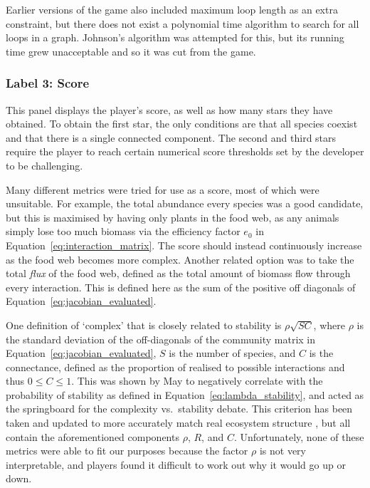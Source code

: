 Earlier versions of the game also included maximum loop length as an extra constraint, but there does not exist a polynomial time algorithm to search for all loops in a graph. Johnson's algorithm was attempted for this, but its running time grew unacceptable and so it was cut from the game.

\subsubsection{Label 3: Score}
This panel displays the player's score, as well as how many stars they have obtained. To obtain the first star, the only conditions are that all species coexist and that there is a single connected component. The second and third stars require the player to reach certain numerical score thresholds set by the developer to be challenging.

Many different metrics were tried for use as a score, most of which were unsuitable. For example, the total abundance every species was a good candidate, but this is maximised by having only plants in the food web, as any animals simply lose too much biomass via the efficiency factor $e_0$ in Equation~\eqref{eq:interaction_matrix}. The score should instead continuously increase as the food web becomes more complex. Another related option was to take the total \emph{flux} of the food web, defined as the total amount of biomass flow through every interaction. This is defined here as the sum of the positive off diagonals of Equation~\eqref{eq:jacobian_evaluated}.

One definition of `complex' that is closely related to stability is $\rho\sqrt{SC}$, where $\rho$ is the standard deviation of the off-diagonals of the community matrix in Equation~\ref{eq:jacobian_evaluated}, $S$ is the number of species, and $C$ is the connectance, defined as the proportion of realised to possible interactions and thus $0\leq C\leq1$. This was shown by May to negatively correlate with the probability of stability as defined in Equation~\eqref{eq:lambda_stability}, and acted as the springboard for the complexity vs.\ stability debate.
This criterion has been taken and updated to more accurately match real ecosystem structure \cite{Allesina2012, Tang2014Correlation}, but all contain the aforementioned components $\rho$, $R$, and $C$.
Unfortunately, none of these metrics were able to fit our purposes because the factor $\rho$ is not very interpretable, and players found it difficult to work out why it would go up or down.

